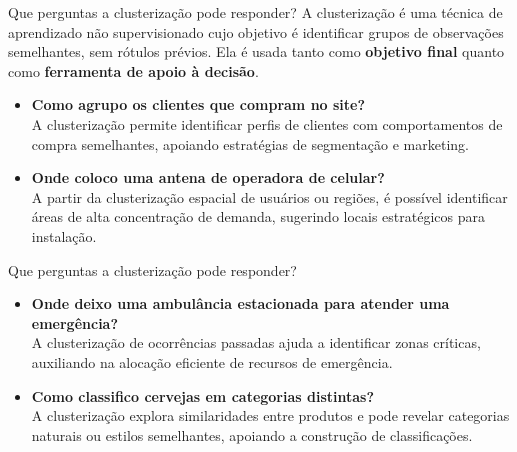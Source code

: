 \documentclass[
  ignorenonframetext,
  aspectratio=169,
]{beamer}
\providecommand{\tightlist}{%
  \setlength{\itemsep}{0pt}\setlength{\parskip}{0pt}}
\begin{document}
\begin{frame}{Que perguntas a clusterização pode responder?}
\label{que-perguntas-a-clusterizauxe7uxe3o-pode-responder}
A clusterização é uma técnica de aprendizado não supervisionado cujo
objetivo é identificar grupos de observações semelhantes, sem rótulos
prévios. Ela é usada tanto como \textbf{objetivo final} quanto como
\textbf{ferramenta de apoio à decisão}.

\pause

\begin{itemize}
\tightlist
\item
  \textbf{Como agrupo os clientes que compram no site?}\\
  A clusterização permite identificar perfis de clientes com
  comportamentos de compra semelhantes, apoiando estratégias de
  segmentação e marketing.
\end{itemize}

\pause

\begin{itemize}
\tightlist
\item
  \textbf{Onde coloco uma antena de operadora de celular?}\\
  A partir da clusterização espacial de usuários ou regiões, é possível
  identificar áreas de alta concentração de demanda, sugerindo locais
  estratégicos para instalação.
\end{itemize}
\end{frame}

\begin{frame}{Que perguntas a clusterização pode responder?}
\label{que-perguntas-a-clusterizauxe7uxe3o-pode-responder-1}
\begin{itemize}
\tightlist
\item
  \textbf{Onde deixo uma ambulância estacionada para atender uma
  emergência?}\\
  A clusterização de ocorrências passadas ajuda a identificar zonas
  críticas, auxiliando na alocação eficiente de recursos de emergência.
\end{itemize}

\pause

\begin{itemize}
\tightlist
\item
  \textbf{Como classifico cervejas em categorias distintas?}\\
  A clusterização explora similaridades entre produtos e pode revelar
  categorias naturais ou estilos semelhantes, apoiando a construção de
  classificações.
\end{itemize}
\end{frame}
\end{document}
